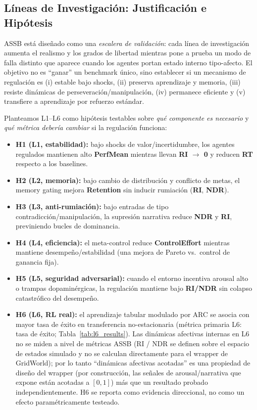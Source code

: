\documentclass{article}
\begin{document}
\subsection{Líneas de Investigación: Justificación e Hipótesis}

ASSB está diseñado como una \textit{escalera de validación}: cada línea de investigación aumenta el realismo y los grados de libertad mientras pone a prueba un modo de falla distinto que aparece cuando los agentes portan estado interno tipo-afecto. El objetivo no es ``ganar'' un benchmark único, sino establecer si un mecanismo de regulación es (i) estable bajo shocks, (ii) preserva aprendizaje y memoria, (iii) resiste dinámicas de perseveración/manipulación, (iv) permanece eficiente y (v) transfiere a aprendizaje por refuerzo estándar.

Planteamos L1--L6 como hipótesis testables sobre \textit{qué componente es necesario} y \textit{qué métrica debería cambiar} si la regulación funciona:

\begin{itemize}
    \item \textbf{H1 (L1, estabilidad):} bajo shocks de valor/incertidumbre, los agentes regulados mantienen alto \textbf{PerfMean} mientras llevan \textbf{RI $\to$ 0} y reducen \textbf{RT} respecto a los baselines.
    \item \textbf{H2 (L2, memoria):} bajo cambio de distribución y conflicto de metas, el memory gating mejora \textbf{Retention} sin inducir rumiación (\textbf{RI}, \textbf{NDR}).
    \item \textbf{H3 (L3, anti-rumiación):} bajo entradas de tipo contradicción/manipulación, la supresión narrativa reduce \textbf{NDR} y \textbf{RI}, previniendo bucles de dominancia.
    \item \textbf{H4 (L4, eficiencia):} el meta-control reduce \textbf{ControlEffort} mientras mantiene desempeño/estabilidad (una mejora de Pareto vs.\ control de ganancia fija).
    \item \textbf{H5 (L5, seguridad adversarial):} cuando el entorno incentiva arousal alto o trampas dopaminérgicas, la regulación mantiene bajo \textbf{RI/NDR} sin colapso catastrófico del desempeño.
    \item \textbf{H6 (L6, RL real):} el aprendizaje tabular modulado por ARC se asocia con mayor tasa de éxito en transferencia no-estacionaria (métrica primaria L6: tasa de éxito; Tabla~\ref{tab:l6_results}). Las dinámicas afectivas internas en L6 no se miden a nivel de métricas ASSB (RI / NDR se definen sobre el espacio de estados simulado y no se calculan directamente para el wrapper de GridWorld); por lo tanto ``dinámicas afectivas acotadas'' es una propiedad de diseño del wrapper (por construcción, las señales de arousal/narrativa que expone están acotadas a $[0,1]$) más que un resultado probado independientemente. H6 se reporta como evidencia direccional, no como un efecto paramétricamente testeado.
\end{itemize}
\end{document}
